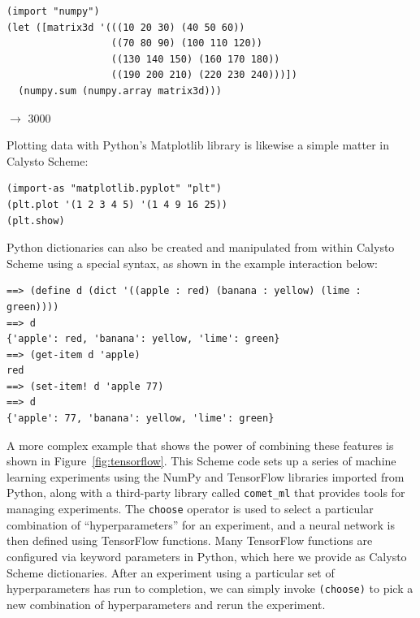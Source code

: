 \documentclass[acmsmall,screen,authorversion]{acmart}
\begin{document}
\noindent
\begin{minipage}{\textwidth}
{\small
\begin{verbatim}
(import "numpy")
(let ([matrix3d '(((10 20 30) (40 50 60))
                  ((70 80 90) (100 110 120))
                  ((130 140 150) (160 170 180))
                  ((190 200 210) (220 230 240)))])
  (numpy.sum (numpy.array matrix3d)))
\end{verbatim}
$\rightarrow$ 3000\\
}
\end{minipage}

\noindent
Plotting data with Python's Matplotlib library is likewise a simple matter in
Calysto Scheme:\\

{\small
\begin{verbatim}
(import-as "matplotlib.pyplot" "plt")
(plt.plot '(1 2 3 4 5) '(1 4 9 16 25))
(plt.show)

\end{verbatim}
}

\noindent
Python dictionaries can also be created and manipulated from within Calysto
Scheme using a special syntax, as shown in the example interaction below:\\

\noindent
\begin{minipage}{\textwidth}
{\small
\begin{verbatim}
==> (define d (dict '((apple : red) (banana : yellow) (lime : green))))
==> d
{'apple': red, 'banana': yellow, 'lime': green}
==> (get-item d 'apple)
red
==> (set-item! d 'apple 77)
==> d
{'apple': 77, 'banana': yellow, 'lime': green}
\end{verbatim}
}
\end{minipage}

\noindent
A more complex example that shows the power of combining these features is
shown in Figure~\ref{fig:tensorflow}. This Scheme code sets up a series of
machine learning experiments using the NumPy and TensorFlow libraries imported
from Python, along with a third-party library called \texttt{comet\_ml} that
provides tools for managing experiments.  The \texttt{choose} operator is used
to select a particular combination of ``hyperparameters'' for an experiment,
and a neural network is then defined using TensorFlow functions.  Many
TensorFlow functions are configured via keyword parameters in Python, which
here we provide as Calysto Scheme dictionaries.  After an experiment using a
particular set of hyperparameters has run to completion, we can simply invoke
\texttt{(choose)} to pick a new combination of hyperparameters and rerun the
experiment.
\end{document}
